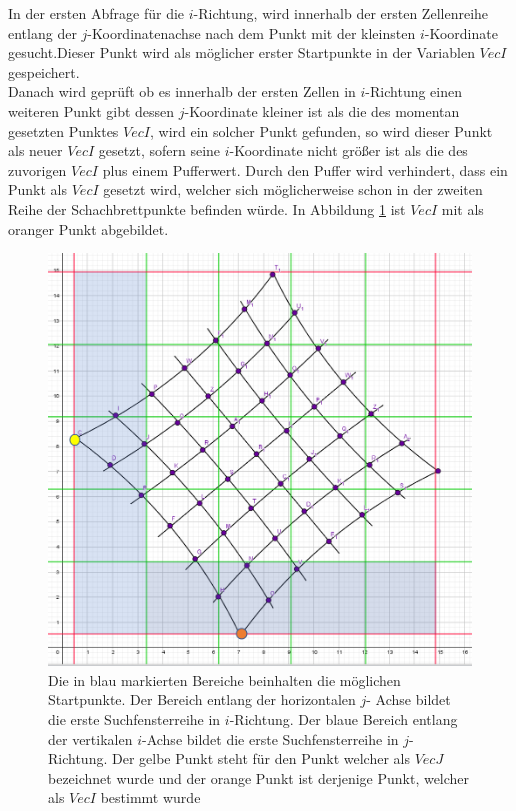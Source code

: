 In der ersten Abfrage für die $i$-Richtung, wird innerhalb der ersten Zellenreihe entlang der $j$-Koordinatenachse nach dem Punkt mit der kleinsten $i$-Koordinate gesucht.Dieser Punkt wird als möglicher erster Startpunkte in der Variablen $VecI$ gespeichert.\\

Danach wird geprüft ob es innerhalb der ersten Zellen in $i$-Richtung einen weiteren Punkt gibt dessen $j$-Koordinate kleiner ist als die des momentan gesetzten Punktes $VecI$, wird ein solcher Punkt gefunden, so wird dieser Punkt als neuer $VecI$ gesetzt, sofern seine $i$-Koordinate nicht größer ist als die des zuvorigen $VecI$ plus einem Pufferwert. Durch den Puffer wird verhindert, dass ein Punkt als $VecI$ gesetzt wird, welcher sich möglicherweise schon in der zweiten Reihe der Schachbrettpunkte befinden würde. In Abbildung \ref{fig:7.1} ist $VecI$ mit als oranger Punkt abgebildet.\\

\begin{figure}[!htb]
	\centering
	\includegraphics[width=0.8\linewidth]{images/VerzeichnetesSchachbrett_1.png}
	\caption[Startpunktsuche in Schachbrettpunkten]{Die in blau markierten Bereiche beinhalten die möglichen Startpunkte. Der Bereich entlang der horizontalen $j$- Achse bildet die erste Suchfensterreihe in $i$-Richtung. Der blaue Bereich entlang der vertikalen $i$-Achse bildet die erste Suchfensterreihe in $j$-Richtung. Der gelbe Punkt steht für den Punkt welcher als $VecJ$ bezeichnet wurde und der orange Punkt ist derjenige Punkt, welcher als $VecI$ bestimmt wurde}
	\label{fig:7.1}
\end{figure}


